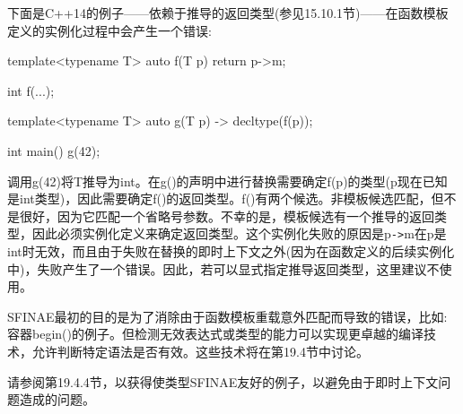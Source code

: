 下面是C++14的例子——依赖于推导的返回类型(参见15.10.1节)——在函数模板定义的实例化过程中会产生一个错误:

\begin{cpp}
template<typename T> auto f(T p) {
	return p->m;
}

int f(...);

template<typename T> auto g(T p) -> decltype(f(p));

int main()
{
	g(42);
}
\end{cpp}

调用g(42)将T推导为int。在g()的声明中进行替换需要确定f(p)的类型(p现在已知是int类型)，因此需要确定f()的返回类型。f()有两个候选。非模板候选匹配，但不是很好，因为它匹配一个省略号参数。不幸的是，模板候选有一个推导的返回类型，因此必须实例化定义来确定返回类型。这个实例化失败的原因是p\texttt{->}m在p是int时无效，而且由于失败在替换的即时上下文之外(因为在函数定义的后续实例化中)，失败产生了一个错误。因此，若可以显式指定推导返回类型，这里建议不使用。

SFINAE最初的目的是为了消除由于函数模板重载意外匹配而导致的错误，比如:容器begin()的例子。但检测无效表达式或类型的能力可以实现更卓越的编译技术，允许判断特定语法是否有效。这些技术将在第19.4节中讨论。

请参阅第19.4.4节，以获得使类型SFINAE友好的例子，以避免由于即时上下文问题造成的问题。



